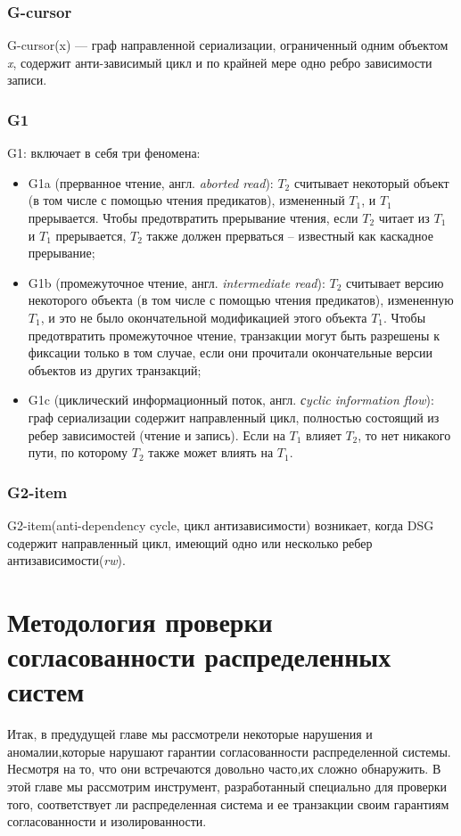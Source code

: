\documentclass[12pt,  openany]{book}
\begin{document}
\subsection{G-cursor}
G-cursor(x) --- граф направленной сериализации, ограниченный одним объектом \textit{x}, содержит анти-зависимый цикл и по крайней мере одно ребро зависимости записи.

\subsection{G1}
G1: включает в себя три феномена: 
\begin{itemize}
\item G1a (прерванное чтение, англ. \textit{aborted read}): $T_2$ считывает некоторый объект (в том числе с помощью чтения предикатов), измененный $T_1$, и $T_1$ прерывается. Чтобы предотвратить прерывание чтения, если $T_2$ читает из $T_1$ и $T_1$ прерывается, $T_2$ также должен прерваться – известный как каскадное прерывание;
\item G1b (промежуточное чтение, англ. \textit{intermediate read}): $T_2$ считывает версию некоторого объекта (в том числе с помощью чтения предикатов), измененную $T_1$, и это не было окончательной модификацией этого объекта $T_1$. Чтобы предотвратить промежуточное чтение, транзакции могут быть разрешены к фиксации только в том случае, если они прочитали окончательные версии объектов из других транзакций;
\item G1c (циклический информационный поток, англ. \textit{сyclic information flow}): граф сериализации содержит направленный цикл, полностью состоящий из ребер зависимостей (чтение и запись). Если на $T_1$ влияет $T_2$, то нет никакого пути, по которому $T_2$ также может влиять на $T_1$.
\end{itemize}

\subsection{G2-item}
G2-item(anti-dependency cycle, цикл антизависимости) возникает, когда DSG содержит направленный цикл, имеющий одно или несколько ребер антизависимости(\textit{rw}). 

\chapter{Методология проверки согласованности распределенных систем}
Итак, в предудущей главе мы рассмотрели некоторые нарушения и аномалии,которые нарушают гарантии согласованности распределенной системы. Несмотря на то, что они встречаются довольно часто,их сложно обнаружить.  В этой главе мы рассмотрим инструмент, разработанный специально для проверки того, соответствует ли распределенная система и ее транзакции своим гарантиям согласованности и изолированности.
\end{document}
